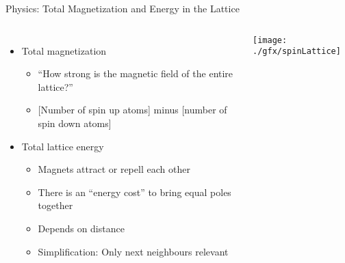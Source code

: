 
\begin{frame}{Physics: Total Magnetization and Energy in the Lattice}
%
\begin{columns}[T]
\begin{itemize}
\item Total magnetization
	\begin{itemize}
	\item \enquote{How strong is the magnetic field of the entire lattice?}
	\item {}[Number of spin up atoms] minus [number of spin down atoms]
	 \end{itemize} 
\item Total lattice energy
	\begin{itemize}
	\item Magnets attract or repell each other
	\item There is an \enquote{energy cost} to bring equal poles together
	\item Depends on distance
	\item Simplification: Only next neighbours relevant
	\end{itemize}
\end{itemize}
%
\texttt{[image: ./gfx/spinLattice]}
\end{columns}
%
\end{frame}


